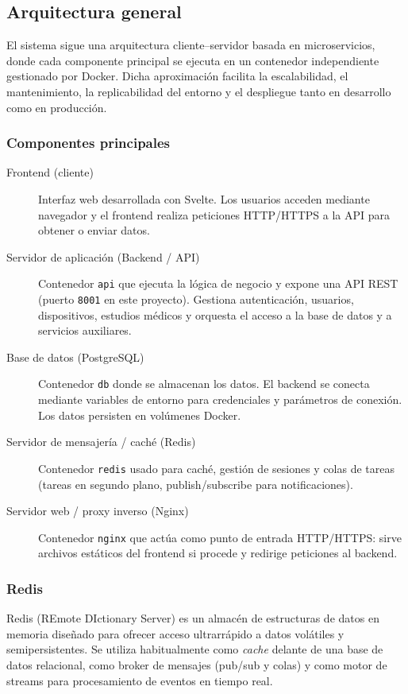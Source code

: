 \documentclass[12pt, a4paper]{article}
\begin{document}
\subsection{Arquitectura general}

El sistema sigue una arquitectura cliente--servidor basada en microservicios, donde cada componente principal se ejecuta en un contenedor independiente gestionado por Docker. Dicha aproximación facilita la escalabilidad, el mantenimiento, la replicabilidad del entorno y el despliegue tanto en desarrollo como en producción.

\subsubsection{Componentes principales}
\begin{description}
	\item[Frontend (cliente)] Interfaz web desarrollada con Svelte. Los usuarios acceden mediante navegador y el frontend realiza peticiones HTTP/HTTPS a la API para obtener o enviar datos.
	\item[Servidor de aplicación (Backend / API)] Contenedor \texttt{api} que ejecuta la lógica de negocio y expone una API REST (puerto \texttt{8001} en este proyecto). Gestiona autenticación, usuarios, dispositivos, estudios médicos y orquesta el acceso a la base de datos y a servicios auxiliares.
	\item[Base de datos (PostgreSQL)] Contenedor \texttt{db} donde se almacenan los datos. El backend se conecta mediante variables de entorno para credenciales y parámetros de conexión. Los datos persisten en volúmenes Docker.
	\item[Servidor de mensajería / caché (Redis)] Contenedor \texttt{redis} usado para caché, gestión de sesiones y colas de tareas (tareas en segundo plano, publish/subscribe para notificaciones).
	\item[Servidor web / proxy inverso (Nginx)] Contenedor \texttt{nginx} que actúa como punto de entrada HTTP/HTTPS: sirve archivos estáticos del frontend si procede y redirige peticiones al backend. 
\end{description}

\subsubsection{Redis}
Redis (REmote DIctionary Server) es un almacén de estructuras de datos en memoria diseñado para ofrecer acceso ultrarrápido a datos volátiles y semipersistentes. Se utiliza habitualmente como \emph{cache} delante de una base de datos relacional, como broker de mensajes (pub/sub y colas) y como motor de streams para procesamiento de eventos en tiempo real. \cite{redis_persistence}
\end{document}
